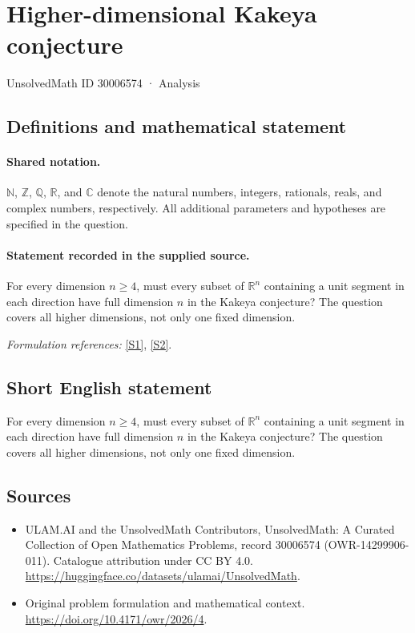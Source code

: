 \documentclass[11pt]{article}
\newcommand{\sref}[2]{\hyperlink{source:#1:#2}{[S#2]}}
\begin{document}
\setcounter{section}{30006573}
\section{Higher-dimensional Kakeya conjecture}\label{30006574}
{\small UnsolvedMath ID 30006574 · Analysis}
\subsection{Definitions and mathematical statement}

\paragraph{Shared notation.}$\mathbb N$, $\mathbb Z$, $\mathbb Q$, $\mathbb R$, and $\mathbb C$ denote the natural numbers, integers, rationals, reals, and complex numbers, respectively. All additional parameters and hypotheses are specified in the question.


\paragraph{Statement recorded in the supplied source.}
For every dimension $n\geq4$, must every subset of $\mathbb R^n$ containing a unit segment in each direction have full dimension $n$ in the Kakeya conjecture? The question covers all higher dimensions, not only one fixed dimension.
\par\smallskip\textit{Formulation references:} \sref{30006574}{1}, \sref{30006574}{2}.
\subsection{Short English statement}
For every dimension $n\geq4$, must every subset of $\mathbb R^n$ containing a unit segment in each direction have full dimension $n$ in the Kakeya conjecture? The question covers all higher dimensions, not only one fixed dimension.
\subsection{Sources}
\begin{itemize}
\item[\hypertarget{source:30006574:1}{S1}] ULAM.AI and the UnsolvedMath Contributors, UnsolvedMath: A Curated Collection of Open Mathematics Problems, record 30006574 (OWR-14299906-011). Catalogue attribution under CC BY 4.0.
\url{https://huggingface.co/datasets/ulamai/UnsolvedMath}.
\item[\hypertarget{source:30006574:2}{S2}] Original problem formulation and mathematical context.
\url{https://doi.org/10.4171/owr/2026/4}.
\end{itemize}
\label{end:30006574}
\end{document}
